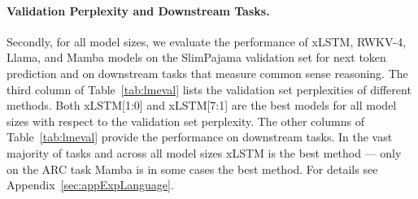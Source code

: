 \documentclass[dvipsnames]{article}
\begin{document}
\paragraph{Validation Perplexity and Downstream Tasks.}
\label{sec:spaj_downstream_eval}
Secondly, for all model sizes, we evaluate the
performance of xLSTM, RWKV-4, Llama, and Mamba models
on the SlimPajama validation set for next token prediction and
on downstream tasks that measure common sense reasoning.
The third column of
Table~\ref{tab:lmeval} lists the validation set perplexities of different methods.
Both xLSTM[1:0] and xLSTM[7:1] are the best models for
all model sizes
with respect to the validation set perplexity.
The other columns of
Table~\ref{tab:lmeval} provide the performance on downstream tasks.
In the vast majority of tasks and across all model sizes
xLSTM is the best method --- only on the ARC task Mamba is
in some cases the best method.
For details see Appendix~\ref{sec:appExpLanguage}.
\end{document}
